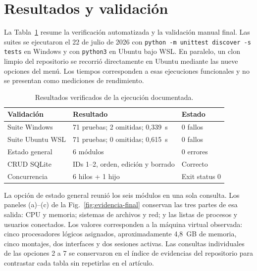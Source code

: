 \documentclass[conference]{IEEEtran}
\begin{document}
\section{Resultados y validaci\'on}
La Tabla~\ref{tab:resultados} resume la verificaci\'on automatizada y la validaci\'on manual final. Las suites se ejecutaron el 22 de julio de 2026 con \texttt{python -m unittest discover -s tests} en Windows y con \texttt{python3} en Ubuntu bajo WSL. En paralelo, un clon limpio del repositorio se recorri\'o directamente en Ubuntu mediante las nueve opciones del men\'u. Los tiempos corresponden a esas ejecuciones funcionales y no se presentan como mediciones de rendimiento.

\begin{table}[t]
\caption{Resultados verificados de la ejecuci\'on documentada.}
\label{tab:resultados}
\centering
\footnotesize
\begin{tabular}{@{}p{}p{}p{}@{}}
\toprule
Validaci\'on & Resultado & Estado \\
\midrule
Suite Windows & 71 pruebas; 2 omitidas; 0,339~s & 0 fallos \\
Suite Ubuntu WSL & 71 pruebas; 0 omitidas; 0,615~s & 0 fallos \\
Estado general & 6 m\'odulos & 0 errores \\
CRUD SQLite & IDs 1--2, orden, edici\'on y borrado & Correcto \\
Concurrencia & 6 hilos + 1 hijo & Exit status 0 \\
\bottomrule
\end{tabular}
\end{table}

La opci\'on de estado general reuni\'o los seis m\'odulos en una sola consulta. Los paneles (a)--(c) de la Fig.~\ref{fig:evidencia-final} conservan las tres partes de esa salida: CPU y memoria; sistemas de archivos y red; y las listas de procesos y usuarios conectados. Los valores corresponden a la m\'aquina virtual observada: cinco procesadores l\'ogicos asignados, aproximadamente 4,8~GB de memoria, cinco montajes, dos interfaces y dos sesiones activas. Las consultas individuales de las opciones 2 a 7 se conservaron en el \'indice de evidencias del repositorio para contrastar cada tabla sin repetirlas en el art\'iculo.
\end{document}
